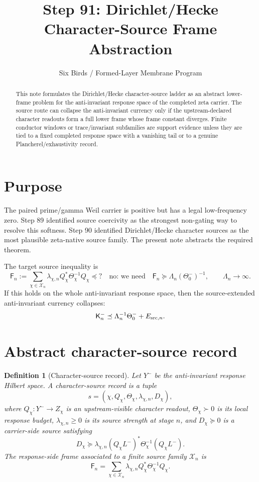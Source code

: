 \documentclass[11pt]{article}
\title{Step 91: Dirichlet/Hecke Character-Source Frame Abstraction}
\author{Six Birds / Formed-Layer Membrane Program}
\date{}
\newtheorem{definition}{Definition}
\newcommand{\K}{\mathsf K}
\newcommand{\F}{\mathsf F}
\newcommand{\Y}{Y^-}
\newcommand{\Thetao}{\Theta^-_0}
\newcommand{\Xn}{\mathcal X_n}
\begin{document}
\maketitle

\begin{abstract}
This note formulates the Dirichlet/Hecke character-source ladder as an abstract lower-frame problem for the anti-invariant response space of the completed zeta carrier.  The source route can collapse the anti-invariant currency only if the upstream-declared character readouts form a full lower frame whose frame constant diverges.  Finite conductor windows or trace/invariant subfamilies are support evidence unless they are tied to a fixed completed response space with a vanishing tail or to a genuine Plancherel/exhaustivity record.
\end{abstract}

\section{Purpose}
The paired prime/gamma Weil carrier is positive but has a legal low-frequency zero.  Step 89 identified source coercivity as the strongest non-gating way to resolve this softness.  Step 90 identified Dirichlet/Hecke character sources as the most plausible zeta-native source family.  The present note abstracts the required theorem.

The target source inequality is
\begin{equation}
  \F_n
  :=\sum_{\chi\in\Xn}\lambda_{\chi,n}Q_\chi^*\Theta_\chi^{-1}Q_\chi
  \preceq? \quad\text{no: we need}\quad
  \F_n\succeq \Lambda_n(\Thetao)^{-1},
  \qquad \Lambda_n\to\infty .
\end{equation}
If this holds on the whole anti-invariant response space, then the source-extended anti-invariant currency collapses:
\begin{equation}
  \K_n^-\preceq \Lambda_n^{-1}\Thetao + E_{{\rm src},n}.
\end{equation}

\section{Abstract character-source record}

\begin{definition}[Character-source record]
Let \(\Y\) be the anti-invariant response Hilbert space. A character-source record is a tuple
\[
  s=(\chi,Q_\chi,\Theta_\chi,\lambda_{\chi,n},D_\chi),
\]
where \(Q_\chi:\Y\to Z_\chi\) is an upstream-visible character readout, \(\Theta_\chi\succ0\) is its local response budget, \(\lambda_{\chi,n}\ge0\) is its source strength at stage \(n\), and \(D_\chi\succeq0\) is a carrier-side source satisfying
\begin{equation}
  D_\chi\succeq
  \lambda_{\chi,n}(Q_\chi L^-)^*\Theta_\chi^{-1}(Q_\chi L^-).
\end{equation}
The response-side frame associated to a finite source family \(\Xn\) is
\begin{equation}
  \F_n=\sum_{\chi\in\Xn}\lambda_{\chi,n}Q_\chi^*\Theta_\chi^{-1}Q_\chi .
\end{equation}
\end{definition}
\end{document}

